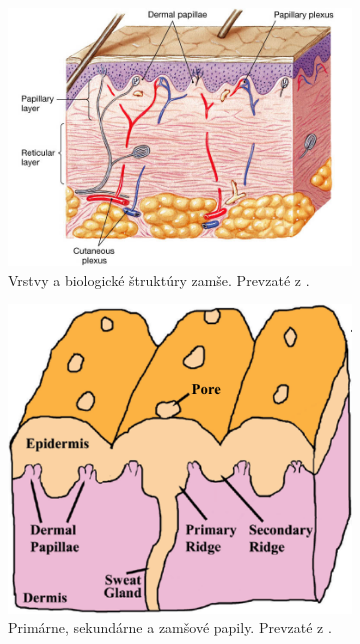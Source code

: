   \begin{figure}[h]\centering
    \centering
    \begin{subfigure}[b]{0.49\linewidth}
      \includegraphics[width=\linewidth]{obrazky-figures/zamsa.jpg}
      \caption{Vrstvy a biologické štruktúry zamše. Prevzaté z \cite{droual_dermis}.}
      \label{obr:zamsa_a_papily/zamsa}
    \end{subfigure}
    \hfill
    \begin{subfigure}[b]{0.49\linewidth}
      \includegraphics[width=\linewidth]{obrazky-figures/papily_prierez.png}
      \caption{Primárne, sekundárne a zamšové papily. Prevzaté z \cite{FingerprintSrcBook}.}
      \label{obr:zamsa_a_papily/papily_prierez}
    \end{subfigure}
    \caption{}
    \label{obr:zamsa_a_papily}
  \end{figure}
  
